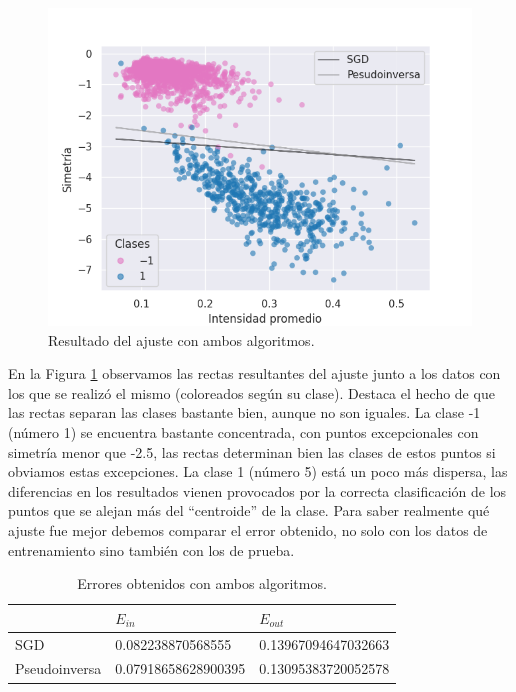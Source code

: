 \documentclass[a4paper, 20pt]{article}
\begin{document}
\begin{figure}[H]
    \centering
    \includegraphics[width=1\textwidth]{results2}
    \caption{Resultado del ajuste con ambos algoritmos.}
    \label{fig:2c}
\end{figure}

En la Figura \ref{fig:2c} observamos las rectas resultantes del ajuste junto a los datos con los que se realizó el mismo (coloreados según su clase). Destaca el hecho de que las rectas separan las clases bastante bien, aunque no son iguales. La clase -1 (número 1) se encuentra bastante concentrada, con puntos excepcionales con simetría menor que -2.5, las rectas determinan bien las clases de estos puntos si obviamos estas excepciones. La clase 1 (número 5) está un poco más dispersa, las diferencias en los resultados vienen provocados por la correcta clasificación de los puntos que se alejan más del ``centroide'' de la clase. Para saber realmente qué ajuste fue mejor debemos comparar el error obtenido, no solo con los datos de entrenamiento sino también con los de prueba.

\begin{table}[H]
\large
\centering
\caption{Errores obtenidos con ambos algoritmos.}
\label{tab:21}
\begin{tabular}{lll}
\toprule
 & $E_{in}$ & $E_{out}$ \\ \midrule
SGD & 0.082238870568555 & 0.13967094647032663 \\
Pseudoinversa & 0.07918658628900395 & 0.13095383720052578 \\
\bottomrule
\end{tabular}
\end{table}
\end{document}
